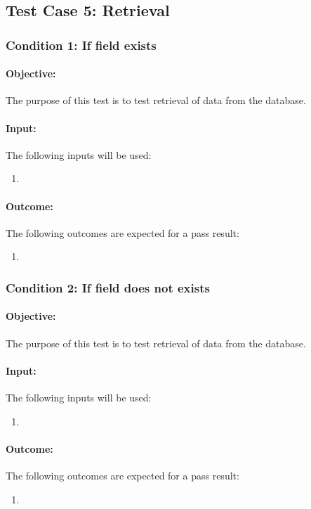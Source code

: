 \documentclass{article}
\begin{document}
\subsection{Test Case 5: Retrieval}\label{test5}
\subsubsection{Condition 1: If field exists }
\paragraph{Objective:} The purpose of this test is to test retrieval of data from the database.
\paragraph{Input:} The following inputs will be used:
\begin{enumerate}
	\item 
\end{enumerate}
\paragraph{Outcome:} The following outcomes are expected for a pass result:
\begin{enumerate}
	\item 
\end{enumerate}
\subsubsection{Condition 2: If field does not exists }
\paragraph{Objective:} The purpose of this test is to test retrieval of data from the database.
\paragraph{Input:} The following inputs will be used:
\begin{enumerate}
	\item 
\end{enumerate}
\paragraph{Outcome:} The following outcomes are expected for a pass result:
\begin{enumerate}
	\item 
\end{enumerate}
\end{document}
